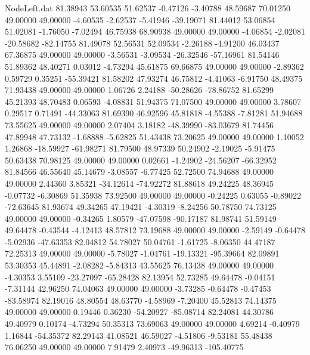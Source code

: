 \begin{filecontents}{NodeLeft.dat}
  81.38943   53.60535   51.62537    -0.47126   -3.40788   48.59687   70.01250   49.00000   49.00000   -4.60535   -2.62537   -5.41946  -39.19071
  81.44012   53.06854   51.02081    -1.76050   -7.02494   46.75938   68.90938   49.00000   49.00000   -4.06854   -2.02081  -20.58682  -82.14755
  81.49078   52.56531   52.09534    -2.26188   -4.91200   46.03437   67.36875   49.00000   49.00000   -3.56531   -3.09534  -26.32546  -57.16961
  81.54146   51.89362   48.40271     0.03012   -4.73294   45.61875   69.66875   49.00000   49.00000   -2.89362    0.59729    0.35251  -55.39421
  81.58202   47.93274   46.75812    -4.41063   -6.91750   48.49375   71.93438   49.00000   49.00000    1.06726    2.24188  -50.28626  -78.86752
  81.65299   45.21393   48.70483     0.06593   -4.08831   51.94375   71.07500   49.00000   49.00000    3.78607    0.29517    0.71491  -44.33063
  81.69390   46.92596   45.81818    -4.55388   -7.81281   51.94688   73.55625   49.00000   49.00000    2.07404    3.18182  -48.39990  -83.03679
  81.74456   47.89948   47.73132    -1.68888   -5.62825   51.43438   73.20625   49.00000   49.00000    1.10052    1.26868  -18.59927  -61.98271
  81.79500   48.97339   50.24902    -2.19025   -5.91475   50.63438   70.98125   49.00000   49.00000    0.02661   -1.24902  -24.56207  -66.32952
  81.84566   46.55640   45.14679    -3.08557   -6.77425   52.72500   74.94688   49.00000   49.00000    2.44360    3.85321  -34.12614  -74.92272
  81.88618   49.24225   48.36945    -0.07732   -6.30869   51.35938   73.92500   49.00000   49.00000   -0.24225    0.63055   -0.89022  -72.63645
  81.93674   49.34265   47.19421    -4.30319   -8.24256   50.78750   74.73125   49.00000   49.00000   -0.34265    1.80579  -47.07598  -90.17187
  81.98741   51.59149   49.64478    -0.43544   -4.12413   48.57812   73.19688   49.00000   49.00000   -2.59149   -0.64478   -5.02936  -47.63353
  82.04812   54.78027   50.04761    -1.61725   -8.06350   44.47187   72.25313   49.00000   49.00000   -5.78027   -1.04761  -19.13321  -95.39664
  82.09891   53.30353   45.44891    -2.08282   -5.84313   43.55625   76.13438   49.00000   49.00000   -4.30353    3.55109  -23.27097  -65.28428
  82.13954   52.73285   49.64478    -0.04151   -7.31144   42.96250   74.04063   49.00000   49.00000   -3.73285   -0.64478   -0.47453  -83.58974
  82.19016   48.80554   48.63770    -4.58969   -7.20400   45.52813   74.14375   49.00000   49.00000    0.19446    0.36230  -54.20927  -85.08714
  82.24081   44.30786   49.40979     0.10174   -4.73294   50.35313   73.69063   49.00000   49.00000    4.69214   -0.40979    1.16844  -54.35372
  82.29143   41.08521   46.59027    -4.51806   -9.53181   55.48438   76.06250   49.00000   49.00000    7.91479    2.40973  -49.96313 -105.40775

\end{filecontents}
